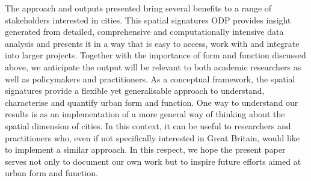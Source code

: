 The approach and outputs presented bring several benefits to a range of
stakeholders interested in cities.
This spatial signatures ODP provides insight generated from detailed,
comprehensive and computationally intensive data analysis and presents it in a
way that is easy to access, work with and integrate into larger projects.
%
Together with the importance of form and function discussed above, we
anticipate the output will be relevant to both academic researchers as well as
policymakers and practitioners.
As a conceptual framework, the spatial signatures provide a flexible yet
generalisable approach to understand, characterise and quantify urban form and
function. One way to understand our results is as an implementation of a
more general way of thinking about the spatial dimension of cities. In this
context, it can be useful to researchers and practitioners who, even if not
specifically interested in Great Britain, would like to implement a similar
approach.
%
In this respect, we hope the present paper serves not only to document our own
work but to inspire future efforts aimed at urban form and function.









